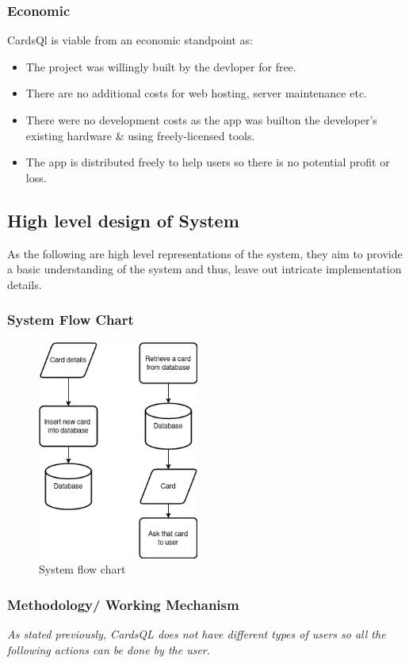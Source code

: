 \documentclass[a4paper]{article}
\begin{document}
\subsubsection{Economic}
\label{sec:orgfbfd3b2}
CardsQl is viable from an economic standpoint as:

\begin{itemize}
\item The project was willingly built by the devloper for free.
\item There are no additional costs for web hosting, server maintenance etc.
\item There were no development costs as the app was builton the developer's existing hardware \& using freely-licensed tools.
\item The app is distributed freely to help users so there is no potential profit or loss.
\end{itemize}
\subsection{High level design of System}
\label{sec:orge0d385b}
As the following are high level representations of the system, they aim to provide a basic understanding of the system and thus, leave out intricate implementation details.

\subsubsection{System Flow Chart}
\label{sec:orgcfc5210}

\begin{figure}[htbp]
\centering
\includegraphics[width=200px]{diagrams/system-flow-chart.png}
\caption{System flow chart}
\end{figure}
\FloatBarrier 

\subsubsection{Methodology/ Working Mechanism}
\label{sec:org804d25e}
\emph{As stated previously, CardsQL does not have different types of users so all the following actions can be done by the user.}
\end{document}
